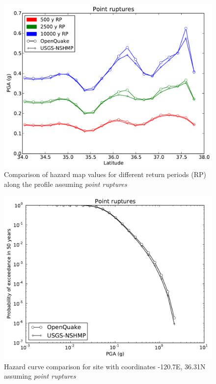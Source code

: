 \begin{figure}
\centering
\includegraphics[width=12cm]{./qareport/pictures/gridded_seismicity_oq_nshmp_point.pdf}
\caption{Comparison of hazard map values for different return periods (RP) along the profile assuming \textit{point ruptures}}
\label{fig:cal_grid_map_point}
\end{figure}

\begin{figure}
\centering
\includegraphics[width=12cm]{./qareport/pictures/-120pt7_36pt31_point.pdf}
\caption{Hazard curve comparison for site with coordinates -120.7E, 36.31N assuming \textit{point ruptures}}
\label{fig:cal_grid_curve_point}
\end{figure}

